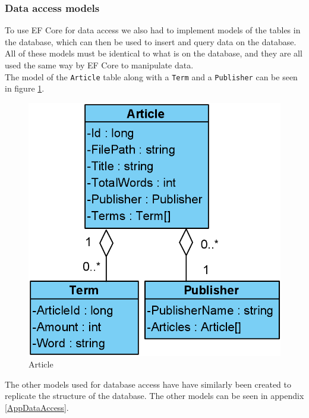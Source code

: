 \subsubsection*{Data access models}
To use EF Core for data access we also had to implement models of the tables in the database, which can then be used to insert and query data on the database. 
All of these models must be identical to what is on the database, and they are all used the same way by EF Core to manipulate data.
\\
The model of the \texttt{Article} table along with a \texttt{Term} and a \texttt{Publisher} can be seen in figure \ref*{Article}. 
\begin{figure}[H]
    \centering
    \includegraphics[scale=0.25]{Images/ArticleModel.PNG}
    \caption{Article}
    \label{Article}
\end{figure}
The other models used for database access have have  similarly been created to replicate the structure of the database. 
The other models can be seen in appendix \ref*{AppDataAccess}.